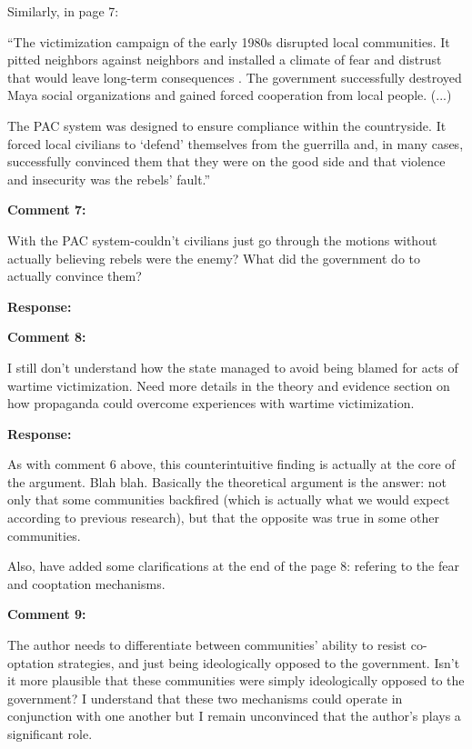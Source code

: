 \documentclass[12pt, a4paper, notitlepage]{article}
\begin{document}
Similarly, in page 7:

``The victimization campaign of the early 1980s disrupted local communities. It pitted neighbors against neighbors and installed a climate of fear and distrust that would leave long-term consequences \citep{Burrell:2013aa}.
The government successfully destroyed Maya social organizations and gained forced cooperation from local people. (...)

The PAC system was designed to ensure compliance within the countryside.
It forced local civilians to `defend' themselves from the guerrilla and, in many cases, successfully convinced them that they were on the good side and that violence and insecurity was the rebels' fault.''

\vspace{15pt}
\noindent\textbf{Comment 7:}
\begin{displayquote}
With the PAC system-couldn't civilians just go through the motions without actually believing rebels were the enemy? What did the government do to actually convince them?
\end{displayquote}

\noindent\textbf{Response:}



\vspace{15pt}
\noindent\textbf{Comment 8:}
\begin{displayquote}
I still don't understand how the state managed to avoid being blamed for acts of wartime victimization. Need more details in the theory and evidence section on how propaganda could overcome experiences with wartime victimization.
\end{displayquote}

\noindent\textbf{Response:}

As with comment 6 above, this counterintuitive finding is actually at the core of the argument. Blah blah. Basically the theoretical argument is the answer: not only that some communities backfired (which is actually what we would expect according to previous research), but that the opposite was true in some other communities.

Also, have added some clarifications at the end of the page 8: refering to the fear and cooptation mechanisms.

\vspace{15pt}
\noindent\textbf{Comment 9:}
\begin{displayquote}
The author needs to differentiate between communities' ability to resist co-optation strategies, and just being ideologically opposed to the government. Isn't it more plausible that these communities were simply ideologically opposed to the government? I understand that these two mechanisms could operate in conjunction with one another but I remain unconvinced that the author's plays a significant role.
\end{displayquote}
\end{document}
